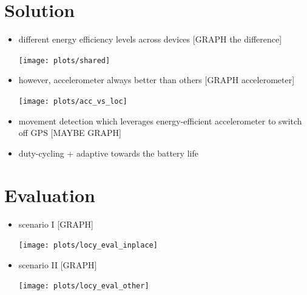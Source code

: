 \documentclass[a2,landscape]{a0poster}
\begin{document}
\section*{Solution}
\begin{itemize}
   \item different energy efficiency levels across devices [GRAPH the difference]
   
\texttt{[image: plots/shared]}

   \item however, accelerometer always better than others [GRAPH accelerometer]

\texttt{[image: plots/acc\_vs\_loc]}

   \item movement detection which leverages energy-efficient accelerometer to switch off GPS [MAYBE GRAPH]
   \item duty-cycling + adaptive towards the battery life
  \end{itemize}


\mbox{}\framebreak
\section*{Evaluation}
\begin{itemize}
   \item scenario I [GRAPH]
   
\texttt{[image: plots/locy\_eval\_inplace]}

   \item scenario II [GRAPH]
   
\texttt{[image: plots/locy\_eval\_other]}

  \end{itemize}
\end{document}
